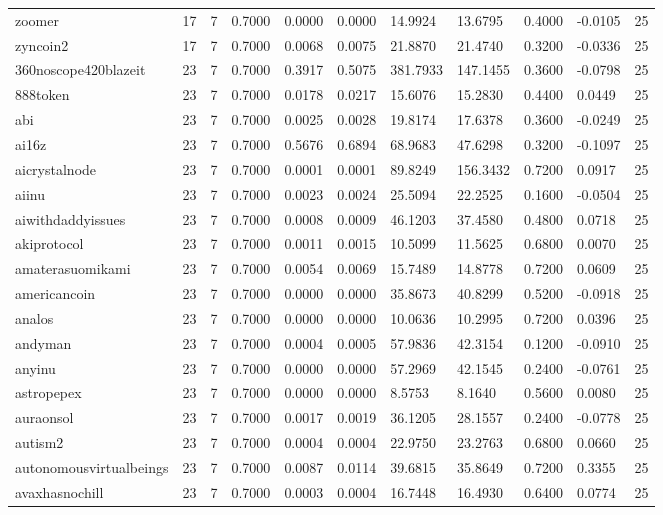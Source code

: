 \begin{table}[htbp]
\begin{tabular}{lllllllllll}
zoomer & 17 & 7 & 0.7000 & 0.0000 & 0.0000 & 14.9924 & 13.6795 & 0.4000 & -0.0105 & 25 \\
zyncoin2 & 17 & 7 & 0.7000 & 0.0068 & 0.0075 & 21.8870 & 21.4740 & 0.3200 & -0.0336 & 25 \\
360noscope420blazeit & 23 & 7 & 0.7000 & 0.3917 & 0.5075 & 381.7933 & 147.1455 & 0.3600 & -0.0798 & 25 \\
888token & 23 & 7 & 0.7000 & 0.0178 & 0.0217 & 15.6076 & 15.2830 & 0.4400 & 0.0449 & 25 \\
abi & 23 & 7 & 0.7000 & 0.0025 & 0.0028 & 19.8174 & 17.6378 & 0.3600 & -0.0249 & 25 \\
ai16z & 23 & 7 & 0.7000 & 0.5676 & 0.6894 & 68.9683 & 47.6298 & 0.3200 & -0.1097 & 25 \\
aicrystalnode & 23 & 7 & 0.7000 & 0.0001 & 0.0001 & 89.8249 & 156.3432 & 0.7200 & 0.0917 & 25 \\
aiinu & 23 & 7 & 0.7000 & 0.0023 & 0.0024 & 25.5094 & 22.2525 & 0.1600 & -0.0504 & 25 \\
aiwithdaddyissues & 23 & 7 & 0.7000 & 0.0008 & 0.0009 & 46.1203 & 37.4580 & 0.4800 & 0.0718 & 25 \\
akiprotocol & 23 & 7 & 0.7000 & 0.0011 & 0.0015 & 10.5099 & 11.5625 & 0.6800 & 0.0070 & 25 \\
amaterasuomikami & 23 & 7 & 0.7000 & 0.0054 & 0.0069 & 15.7489 & 14.8778 & 0.7200 & 0.0609 & 25 \\
americancoin & 23 & 7 & 0.7000 & 0.0000 & 0.0000 & 35.8673 & 40.8299 & 0.5200 & -0.0918 & 25 \\
analos & 23 & 7 & 0.7000 & 0.0000 & 0.0000 & 10.0636 & 10.2995 & 0.7200 & 0.0396 & 25 \\
andyman & 23 & 7 & 0.7000 & 0.0004 & 0.0005 & 57.9836 & 42.3154 & 0.1200 & -0.0910 & 25 \\
anyinu & 23 & 7 & 0.7000 & 0.0000 & 0.0000 & 57.2969 & 42.1545 & 0.2400 & -0.0761 & 25 \\
astropepex & 23 & 7 & 0.7000 & 0.0000 & 0.0000 & 8.5753 & 8.1640 & 0.5600 & 0.0080 & 25 \\
auraonsol & 23 & 7 & 0.7000 & 0.0017 & 0.0019 & 36.1205 & 28.1557 & 0.2400 & -0.0778 & 25 \\
autism2 & 23 & 7 & 0.7000 & 0.0004 & 0.0004 & 22.9750 & 23.2763 & 0.6800 & 0.0660 & 25 \\
autonomousvirtualbeings & 23 & 7 & 0.7000 & 0.0087 & 0.0114 & 39.6815 & 35.8649 & 0.7200 & 0.3355 & 25 \\
avaxhasnochill & 23 & 7 & 0.7000 & 0.0003 & 0.0004 & 16.7448 & 16.4930 & 0.6400 & 0.0774 & 25 \\

\end{tabular}
\end{table}
